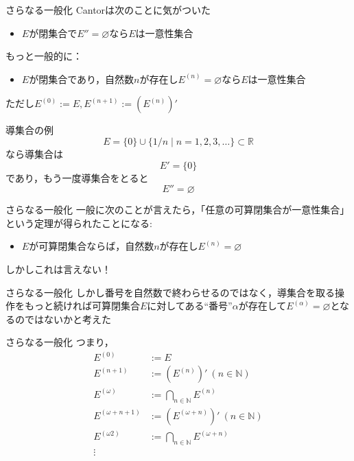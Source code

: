 \documentclass[dvipdfmx,17pt]{beamer}
\renewcommand{\emptyset}{\varnothing}
\theoremstyle{plain}
\newcommand{\N}{\mathbb{N}}
\newcommand{\R}{\mathbb{R}}
\begin{document}
\begin{frame}{さらなる一般化}
Cantorは次のことに気がついた
\begin{itemize}
\item $E$が閉集合で$E'' = \varnothing$なら$E$は一意性集合
\end{itemize}
もっと一般的に：
\begin{itemize}
\item $E$が閉集合であり，自然数$n$が存在し$E^{(n)} = \varnothing$なら$E$は一意性集合
\end{itemize}
ただし$E^{(0)} := E, E^{(n+1)} := (E^{(n)})'$
\end{frame}

\begin{frame}{導集合の例}
\[ E = \{0\} \cup \{1/n \mid n = 1, 2, 3, \dots \} \subset \R \]
なら導集合は
\[ E' = \{0\} \]
であり，もう一度導集合をとると
\[ E'' = \emptyset \]
\end{frame}



\begin{frame}{さらなる一般化}
一般に次のことが言えたら，「任意の可算閉集合が一意性集合」という定理が得られたことになる:

\begin{itemize}
\item $E$が可算閉集合ならば，自然数$n$が存在し$E^{(n)} = \varnothing$
\end{itemize}

しかしこれは言えない！
\end{frame}

\begin{frame}{さらなる一般化}
しかし番号を自然数で終わらせるのではなく，導集合を取る操作をもっと続ければ可算閉集合$E$に対してある“番号”$\alpha$が存在して$E^{(\alpha)} = \varnothing$となるのではないかと考えた
\end{frame}

\begin{frame}{さらなる一般化}
つまり，
\begin{align*}
E^{(0)} &:= E \\
E^{(n+1)} &:= (E^{(n)})'\ (n\in\N) \\
E^{(\omega)} &:= \bigcap_{n\in\N} E^{(n)} \\
E^{(\omega+n+1)} &:= (E^{(\omega+n)})'\ (n\in\N) \\
E^{(\omega 2)} &:= \bigcap_{n\in\N} E^{(\omega + n)} \\
\vdots
\end{align*}
\end{frame}
\end{document}
